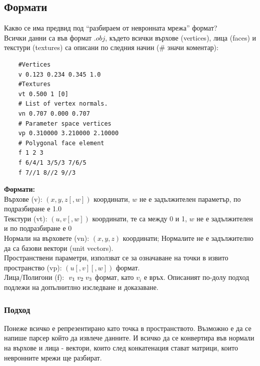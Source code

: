 \newpage
\subsection{Формати}
Какво се има предвид под ``разбираем от невронната мрежа'' формат?\\
Всички данни са във формат $.obj$, където всички върхове (vertices), лица (faces) и текстури (textures) са описани по следния начин ($\#$ значи коментар):

\begin{lstlisting}
    #Vertices
    v 0.123 0.234 0.345 1.0
    #Textures
    vt 0.500 1 [0]
    # List of vertex normals.
    vn 0.707 0.000 0.707
    # Parameter space vertices
    vp 0.310000 3.210000 2.10000
    # Polygonal face element
    f 1 2 3
    f 6/4/1 3/5/3 7/6/5
    f 7//1 8//2 9//3
\end{lstlisting}
\textbf{Формати:}\\
Върхове (v): $(x,y,z[,w])$ координати, $w$ не е задължителен параметър, по подразбиране е 1.0\\
Текстури (vt): $(u, v [,w])$ координати, те са между 0 и 1, $w$ не е задължителен и по подразбиране е 0 \\
Нормали на върховете (vn): $(x,y,z)$ координати; Нормалите не е задължително да са базови вектори (unit vectors). \\
Пространствени параметри, използват се за означаване на точки в извито пространство (vp): $(u[,v][,w])$ формат.\\
Лица/Полигони (f): $\hspace{1mm}v_1\hspace{1mm}v_2 \hspace{1mm}v_3$ формат, като $v_i$ е връх.
Описаният по-долу подход подлежи на допълнитлно изследване и доказаване.

\subsubsection{Подход}

Понеже всичко е репрезентирано като точка в пространството. Възможно е да се напише парсер който да извлече данните. И всичко да се конвертира във нормали на върхове и лица - вектори, които след конкатенация стават матрици, които невронните мрежи ще разбират.\\

